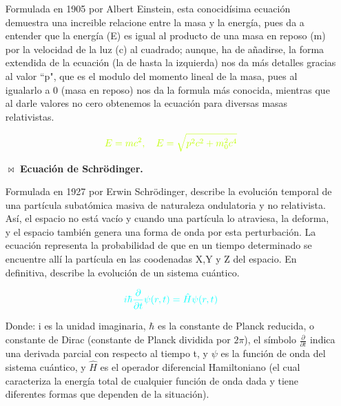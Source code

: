 \documentclass[12pt,letterpaper]{article}
\begin{document}
\begin{itemize}
    Formulada en 1905 por Albert Einstein, esta conocidísima ecuación demuestra una increible relacione entre la masa y la energía, pues da a entender que la energía (E) es igual al producto de una masa en reposo (m) por la velocidad de la luz (c) al cuadrado; aunque, ha de añadirse, la forma extendida de la ecuación (la de hasta la izquierda) nos da más detalles gracias al valor ``p", que es el modulo del momento lineal de la masa, pues al igualarlo a 0 (masa en reposo) nos da la formula más conocida, mientras que al darle valores no cero obtenemos la ecuación para diversas masas relativistas.\newline

    \begin{equation*}
    \textcolor{lime}{E=mc^{2},\quad E=\sqrt{p^{2}c^{2}+m_{0}^{2}c^{4}}}
    \end{equation*}\newline
    
    \item[$\Join$] \textbf{Ecuación de Schrödinger.}\newline
    
    Formulada en 1927 por Erwin Schrödinger, describe la evolución temporal de una partícula subatómica masiva de naturaleza ondulatoria y no relativista. Así, el espacio no está vacío y cuando una partícula lo atraviesa, la deforma, y el espacio también genera una forma de onda por esta perturbación. La ecuación representa la probabilidad de que en un tiempo determinado se encuentre allí la partícula en las coodenadas X,Y y Z del espacio. En definitiva, describe la evolución de un sistema cuántico.

    \begin{equation*}
    \textcolor{Cyan1}{i\hbar \frac{\partial }{\partial t}\psi (r,t)=\hat{H}\psi (r,t)}
    \end{equation*}\newline

    Donde: i es la unidad imaginaria, $\hbar$ es la constante de Planck reducida, o constante de Dirac (constante de Planck dividida por $2\pi$), el símbolo $\frac{\partial }{\partial t}$ indica una derivada parcial con respecto al tiempo t, y $\psi$ es la función de onda del sistema cuántico, y $\hat{H}$ es el operador diferencial Hamiltoniano (el cual caracteriza la energía total de cualquier función de onda dada y tiene diferentes formas que dependen de la situación).
    
\end{itemize}

\end{document}
